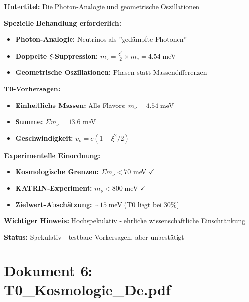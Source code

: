 \documentclass[12pt,a4paper]{article}
\newcommand{\xipar}{\xi}
\begin{document}
	\begin{documentbox}
		\textbf{Untertitel:} Die Photon-Analogie und geometrische Oszillationen
		
		\textbf{Spezielle Behandlung erforderlich:}
		\begin{itemize}
			\item \textbf{Photon-Analogie:} Neutrinos als ''gedämpfte Photonen''
			\item \textbf{Doppelte $\xi$-Suppression:} $m_\nu = \frac{\xipar^2}{2} \times m_e = 4.54$ meV
			\item \textbf{Geometrische Oszillationen:} Phasen statt Massendifferenzen
		\end{itemize}
		
		\textbf{T0-Vorhersagen:}
		\begin{itemize}
			\item \textbf{Einheitliche Massen:} Alle Flavors: $m_\nu = 4.54$ meV
			\item \textbf{Summe:} $\Sigma m_\nu = 13.6$ meV
			\item \textbf{Geschwindigkeit:} $v_\nu = c(1 - \xipar^2/2)$
		\end{itemize}
		
		\textbf{Experimentelle Einordnung:}
		\begin{itemize}
			\item \textbf{Kosmologische Grenzen:} $\Sigma m_\nu < 70$ meV $\checkmark$
			\item \textbf{KATRIN-Experiment:} $m_\nu < 800$ meV $\checkmark$
			\item \textbf{Zielwert-Abschätzung:} $\sim 15$ meV (T0 liegt bei 30\%)
		\end{itemize}
		
		\textbf{Wichtiger Hinweis:} Hochspekulativ - ehrliche wissenschaftliche Einschränkung
		
		\textbf{Status:} Spekulativ - testbare Vorhersagen, aber unbestätigt
	\end{documentbox}
	
	\section{Dokument 6: T0\_Kosmologie\_De.pdf}
	
\end{document}
